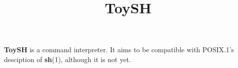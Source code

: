 \documentclass{article}
\title{ToySH}
\begin{document}
	\maketitle

	\textbf{ToySH} is a command interpreter. It aims to be compatible with
	POSIX.1's desciption of \textbf{sh}(1), although it is not yet.
\end{document}
